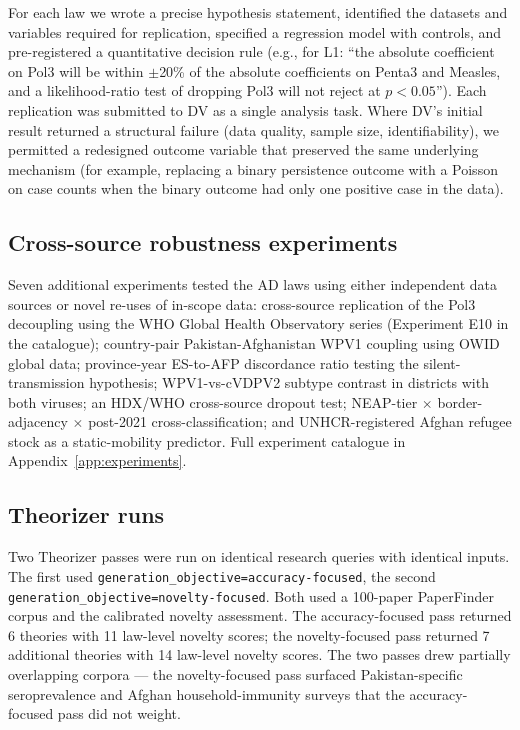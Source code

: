 \documentclass[11pt]{article}
\begin{document}
For each law we wrote a precise hypothesis statement, identified the datasets and variables required for replication, specified a regression model with controls, and pre-registered a quantitative decision rule (e.g., for L1: ``the absolute coefficient on Pol3 will be within $\pm$20\% of the absolute coefficients on Penta3 and Measles, and a likelihood-ratio test of dropping Pol3 will not reject at $p<0.05$''). Each replication was submitted to DV as a single analysis task. Where DV's initial result returned a structural failure (data quality, sample size, identifiability), we permitted a redesigned outcome variable that preserved the same underlying mechanism (for example, replacing a binary persistence outcome with a Poisson on case counts when the binary outcome had only one positive case in the data).

\subsection{Cross-source robustness experiments}

Seven additional experiments tested the AD laws using either independent data sources or novel re-uses of in-scope data: cross-source replication of the Pol3 decoupling using the WHO Global Health Observatory series (Experiment E10 in the catalogue); country-pair Pakistan-Afghanistan WPV1 coupling using OWID global data; province-year ES-to-AFP discordance ratio testing the silent-transmission hypothesis; WPV1-vs-cVDPV2 subtype contrast in districts with both viruses; an HDX/WHO cross-source dropout test; NEAP-tier $\times$ border-adjacency $\times$ post-2021 cross-classification; and UNHCR-registered Afghan refugee stock as a static-mobility predictor. Full experiment catalogue in Appendix~\ref{app:experiments}.

\subsection{Theorizer runs}

Two Theorizer passes were run on identical research queries with identical inputs. The first used \texttt{generation\_objective={accuracy-focused}}, the second \texttt{generation\_objective={novelty-focused}}. Both used a 100-paper PaperFinder corpus and the calibrated novelty assessment. The accuracy-focused pass returned 6 theories with 11 law-level novelty scores; the novelty-focused pass returned 7 additional theories with 14 law-level novelty scores. The two passes drew partially overlapping corpora --- the novelty-focused pass surfaced Pakistan-specific seroprevalence and Afghan household-immunity surveys that the accuracy-focused pass did not weight.
\end{document}
